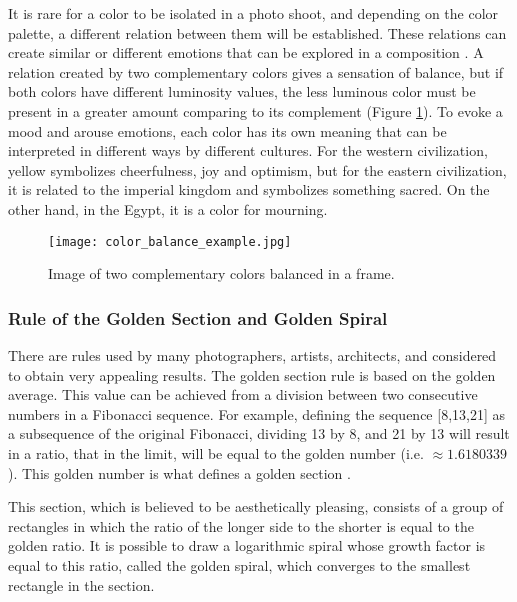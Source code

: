 It is rare for a color to be isolated in a photo shoot, and depending on the color palette, a different relation between them will be established. These relations can create similar or different emotions that can be explored in a composition \cite{Santos}.
A relation created by two complementary colors gives a sensation of balance, but if both colors have different luminosity values, the less luminous color must be present in a greater amount comparing to its complement (Figure \ref{fig:color_balance_image}).
To evoke a mood and arouse emotions, each color has its own meaning that can be interpreted in different ways by different cultures. For the western civilization, yellow symbolizes cheerfulness, joy and optimism, but for the eastern civilization, it is related to the imperial kingdom and symbolizes something sacred. On the other hand, in the Egypt, it is a color for mourning.

\begin{figure}[htbp]
    \centering
	\label{fig:color_balance_example}
    \texttt{[image: color\_balance\_example.jpg]}
  \caption{Image of two complementary colors balanced in a frame. \cite{Santos}}
  \label{fig:color_balance_image}
\end{figure}

\subsubsection{Rule of the Golden Section and Golden Spiral}
\label{subsub:golden_section}

There are rules used by many photographers, artists, architects, and considered to obtain very appealing results. The golden section rule is based on the golden average. This value can be achieved from a division between two consecutive numbers in a Fibonacci sequence. For example, defining the sequence [8,13,21] as a subsequence of the original Fibonacci, dividing 13 by 8, and 21 by 13 will result in a ratio, that in the limit, will be equal to the golden number (i.e. $\approx 1.6180339$). This golden number is what defines a golden section \cite{Santos}. 

This section, which is believed to be aesthetically pleasing, consists of a group of rectangles in which the ratio of the longer side to the shorter is equal to the golden ratio. It is possible to draw a logarithmic spiral whose growth factor is equal to this ratio, called the golden spiral, which converges to the smallest rectangle in the section. 

